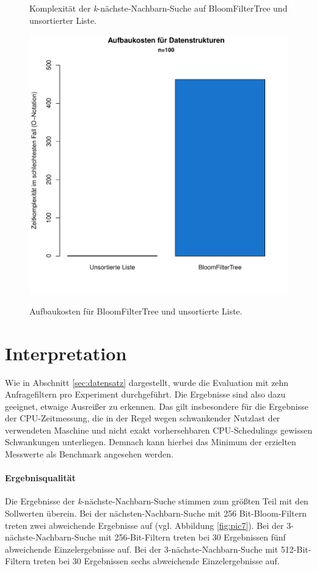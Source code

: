 \begin{figure}[hptb]
	\caption[Komplexität der \textit{k}-nächste-Nachbarn-Suche auf BloomFilterTree und unsortierter Liste]{Komplexität der \textit{k}-nächste-Nachbarn-Suche auf BloomFilterTree und unsortierter Liste.}\label{fig:pic18}
\end{figure} 
\begin{figure}[hptb]
	\centering
	\includegraphics[scale=0.7]{pictures/cost.pdf}\\
	\caption[Aufbaukosten für BloomFilterTree und unsortierte Liste]{Aufbaukosten für BloomFilterTree und unsortierte Liste.}\label{fig:pic19}
\end{figure}
\newpage
\section{Interpretation}\label{sec:interpretation}
Wie in Abschnitt \ref{sec:datensatz} dargestellt, wurde die Evaluation mit zehn Anfragefiltern pro Experiment durchgeführt. Die Ergebnisse sind also dazu geeignet, etwaige Ausreißer zu erkennen. Das gilt insbesondere für die Ergebnisse der CPU-Zeitmessung, die in der Regel wegen schwankender Nutzlast der verwendeten Maschine und nicht exakt vorhersehbaren CPU-Schedulings gewissen Schwankungen unterliegen. Demnach kann hierbei das Minimum der erzielten Messwerte als Benchmark angesehen werden. 
\paragraph*{Ergebnisqualität}
Die Ergebnisse der \textit{k}-nächste-Nachbarn-Suche stimmen zum größten Teil mit den Sollwerten überein. Bei der nächsten-Nachbarn-Suche mit 256 Bit-Bloom-Filtern treten zwei abweichende Ergebnisse auf (vgl. Abbildung \ref{fig:pic7}). Bei der 3-nächste-Nachbarn-Suche mit 256-Bit-Filtern treten bei 30 Ergebnissen fünf abweichende Einzelergebnisse auf. Bei der 3-nächste-Nachbarn-Suche mit 512-Bit-Filtern treten bei 30 Ergebnissen sechs abweichende Einzelergebnisse auf. 

